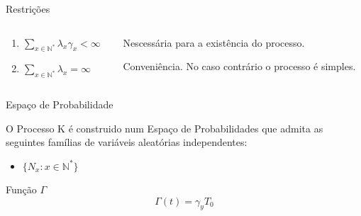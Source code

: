 \documentclass[xcolor=pdftex,dvipsnames]{beamer}
\newcommand{\Nz}{{\mathbb{N^*}}}
\begin{document}
\begin{frame}{Restrições}

  \begin{columns}
    \begin{column}{0.3\textwidth}
      \begin{enumerate}
      \item $ \displaystyle \sum_{x\in \Nz} \lambda_x \gamma_x <
        \infty $    
        \bigskip
      \item $ \displaystyle \sum_{x\in \Nz} \lambda_x = \infty $
      \end{enumerate}

    \end{column}
    
    \begin{column}{0.7\textwidth}
  
      Nescessária para a existência do processo.
      
      Conveniência. No caso contrário o processo é simples.
      
    \end{column}
  \end{columns}
  
  
\end{frame}

\begin{frame}{Espaço de Probabilidade}

  O Processo K é construido num Espaço de Probabilidades que admita as
  seguintes famílias de variáveis aleatórias independentes:

  \begin{itemize}
  \item $\{ N_x: x \in \Nz\}$
  \end{itemize}
  
\end{frame}

\begin{frame}{Função $\Gamma$}
  \begin{displaymath}
    \Gamma(t) = \gamma_y T_0 
  \end{displaymath}
\end{frame}
\end{document}
